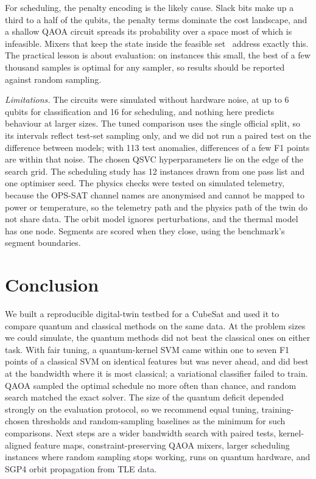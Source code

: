 \documentclass[conference]{IEEEtran}
\begin{document}
For scheduling, the penalty encoding is the likely cause. Slack bits make up a third to a
half of the qubits, the penalty terms dominate the cost landscape, and a shallow QAOA circuit
spreads its probability over a space most of which is infeasible. Mixers that keep the state
inside the feasible set~\cite{hadfield2019} address exactly this. The practical lesson is
about evaluation: on instances this small, the best of a few thousand samples is optimal for
any sampler, so results should be reported against random sampling.

\textit{Limitations.} The circuits were simulated without hardware noise, at up to 6 qubits
for classification and 16 for scheduling, and nothing here predicts behaviour at larger
sizes. The tuned comparison uses the single official split, so its intervals reflect test-set
sampling only, and we did not run a paired test on the difference between models; with 113
test anomalies, differences of a few F1 points are within that noise. The chosen QSVC
hyperparameters lie on the edge of the search grid. The
scheduling study has 12 instances drawn from one pass list and one optimiser seed. The
physics checks were tested on simulated telemetry, because the OPS-SAT channel names are
anonymised and cannot be mapped to power or temperature, so the telemetry path and the
physics path of the twin do not share data. The orbit model ignores perturbations, and the
thermal model has one node. Segments are scored when they close, using the benchmark's
segment boundaries.

\section{Conclusion}
We built a reproducible digital-twin testbed for a CubeSat and used it to compare quantum and
classical methods on the same data. At the problem sizes we could simulate, the quantum methods
did not beat the classical ones on either task. With fair tuning, a quantum-kernel SVM came
within one to seven F1 points of a classical SVM on identical features but was never ahead,
and did best at the bandwidth where it is most classical; a variational classifier failed to
train. QAOA sampled the optimal schedule no more often than chance, and random search matched
the exact solver. The size of the quantum deficit depended strongly on the evaluation
protocol, so we recommend equal tuning, training-chosen thresholds and random-sampling
baselines as the minimum for such comparisons. Next steps are a wider bandwidth search with
paired tests, kernel-aligned feature maps, constraint-preserving QAOA mixers, larger
scheduling instances where random sampling stops working, runs on quantum hardware, and SGP4
orbit propagation from TLE data.
\end{document}
